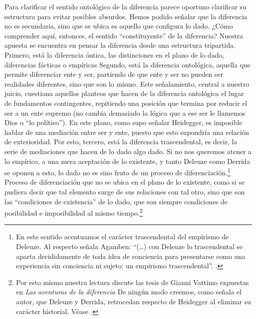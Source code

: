 Para clarificar el sentido ontológico de la diferencia parece oportuno clarificar su estructura para evitar posibles absurdos. Hemos podido señalar que la diferencia no es secundaria, sino que se ubica es aquello que configura lo dado. ¿Cómo comprender aquí, entonces, el sentido \enquote{constituyente} de la diferencia? Nuestra apuesta se encuentra en pensar la diferencia desde una estructura tripartida. Primero, está la diferencia óntica, las distinciones en el plano de lo dado, diferencias fácticas o empíricas Segundo, está la diferencia ontológica, aquella que permite diferenciar ente y ser, partiendo de que ente y ser no pueden ser realidades diferentes, sino que son lo mismo. Este señalamiento, central a nuestro juicio, cuestiona aquellos planteos que hacen de la diferencia ontológica el lugar de fundamentos contingentes, repitiendo una posición que termina por reducir el ser a un ente supremo (no cambia demasiado la lógica que a ese ser le llamemos Dios o \enquote{lo político}). En este plano, como supo señalar Heidegger, es imposible hablar de una mediación entre ser y ente, puesto que esto supondría una relación de exterioridad. Por esto, tercero, está la diferencia trascendental, es decir, la serie de mediaciones que hacen de lo dado algo dado. Si no nos queremos atener a lo empírico, a una mera aceptación de lo existente, y tanto Deleuze como Derrida se oponen a esto, lo dado no es sino fruto de un proceso de diferenciación.\footnote{En este sentido acentuamos el carácter trascendental del empirismo de Deleuze. Al respecto señala Agamben: \enquote{(\ldots) con Deleuze lo trascendental se aparta decididamente de toda idea de conciencia para presentarse como una experiencia sin conciencia ni sujeto: un empirismo trascendental}. \cite{@6990-AGAMBEN2008}.} Proceso de diferenciación que no se ubica en el plano de lo existente, como si se pudiera decir que tal elemento surge de sus relaciones con tal otro, sino que son las \enquote{condiciones de existencia} de lo dado, que son siempre condiciones de posibilidad e imposibilidad al mismo tiempo.\footnote{Por esto mismo nuestra lectura discute las tesis de Gianni Vattimo expuestas en \emph{Las aventuras de la diferencia} De ningún modo creemos, como señala el autor, que Deleuze y Derrida, retrocedan respecto de Heidegger al eliminar su carácter historial. Véase \cite{@6991-VATTIMO1999}.}


